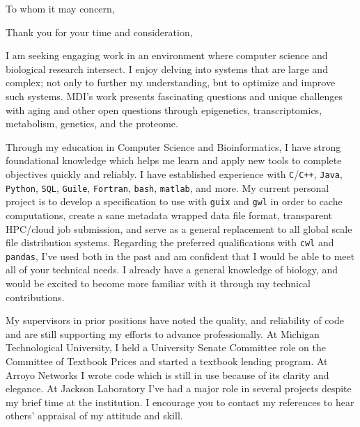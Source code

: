 \documentclass[11pt,a4paper,sans]{moderncv}        %
\begin{document}
\date{January 27, 2020}
\opening{To whom it may concern,}
\closing{Thank you for your time and consideration,}
\makelettertitle


I am seeking engaging work in an environment where computer science and biological research intersect.  I enjoy delving into systems that are large and complex; not only to further my understanding, but to optimize and improve such systems.  MDI's work presents fascinating questions and unique challenges with aging and other open questions through  epigenetics, transcriptomics, metabolism, genetics, and the proteome.


Through my education in Computer Science and Bioinformatics, I have strong foundational knowledge which helps me learn and apply new tools to complete objectives quickly and reliably.  I have established experience with \texttt{C}/\texttt{C++}, \texttt{Java}, \texttt{Python}, \texttt{SQL}, \texttt{Guile}, \texttt{Fortran}, \texttt{bash}, \texttt{matlab}, and more.  My current personal project is to develop a specification to use with \texttt{guix} and \texttt{gwl} in order to cache computations, create a sane metadata wrapped data file format, transparent HPC/cloud job submission, and serve as a general replacement to all global scale file distribution systems.  Regarding the preferred qualifications with \texttt{cwl} and \texttt{pandas}, I've used both in the past and am confident that I would be able to meet all of your technical needs.  I already have a general knowledge of biology, and would be excited to become more familiar with it through my technical contributions.


My supervisors in prior positions have noted the quality, and reliability of code and are still supporting my efforts to advance professionally.  At Michigan Technological University, I held a University Senate Committee role on the Committee of Textbook Prices and started a textbook lending program.  At Arroyo Networks I wrote code which is still in use because of its clarity and elegance.  At Jackson Laboratory I've had a major role in several projects despite my brief time at the institution.  I encourage you to contact my references to hear others' appraisal of my attitude and skill.



\makeletterclosing
\end{document}
